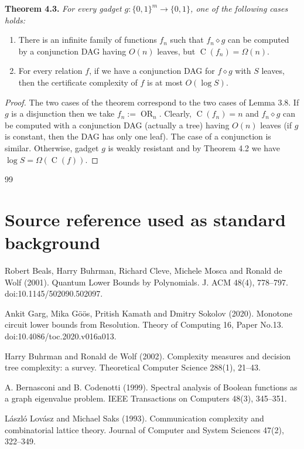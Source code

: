 \documentclass[10pt,a4paper]{article}
\newcommand{\bits}{\{0,1\}}
\newcommand{\CC}{\operatorname C}
\newcommand{\comp}{\diamond}
\newcommand{\OR}{\operatorname{OR}}
\newenvironment{originalresult}[1]{\par\medskip\noindent\textbf{#1.}\itshape}{\par\medskip}
\begin{document}
\begin{originalresult}{Theorem 4.3}
For every gadget $g:\bits^m\to\bits$, one of the following cases holds:
\begin{enumerate}
\item[(i)] There is an infinite family of functions $f_n$ such that $f_n\comp g$ can be computed by a conjunction DAG having $O(n)$ leaves, but $\CC(f_n)=\Omega(n)$.
\item[(ii)] For every relation $f$, if we have a conjunction DAG for $f\comp g$ with $S$ leaves, then the certificate complexity of $f$ is at most $O(\log S)$.
\end{enumerate}
\end{originalresult}

\begin{proof}
The two cases of the theorem correspond to the two cases of Lemma 3.8. If $g$ is a disjunction then we take $f_n:=\OR_n$. Clearly, $\CC(f_n)=n$ and $f_n\comp g$ can be computed with a conjunction DAG (actually a tree) having $O(n)$ leaves (if $g$ is constant, then the DAG has only one leaf). The case of a conjunction is similar.
Otherwise, gadget $g$ is weakly resistant and by Theorem 4.2 we have $\log S=\Omega(\CC(f))$.
\end{proof}

\begin{thebibliography}{99}
\section*{Source reference used as standard background}
Robert Beals, Harry Buhrman, Richard Cleve, Michele Mosca and Ronald de Wolf (2001). Quantum Lower Bounds by Polynomials. J. ACM 48(4), 778--797. doi:10.1145/502090.502097.

Ankit Garg, Mika G\"o\"os, Pritish Kamath and Dmitry Sokolov (2020). Monotone circuit lower bounds from Resolution. Theory of Computing 16, Paper No.13. doi:10.4086/toc.2020.v016a013.

Harry Buhrman and Ronald de Wolf (2002). Complexity measures and decision tree complexity: a survey. Theoretical Computer Science 288(1), 21--43.

A. Bernasconi and B. Codenotti (1999). Spectral analysis of Boolean functions as a graph eigenvalue problem. IEEE Transactions on Computers 48(3), 345--351.

L\'aszl\'o Lov\'asz and Michael Saks (1993). Communication complexity and combinatorial lattice theory. Journal of Computer and System Sciences 47(2), 322--349.
\end{thebibliography}
\end{document}
